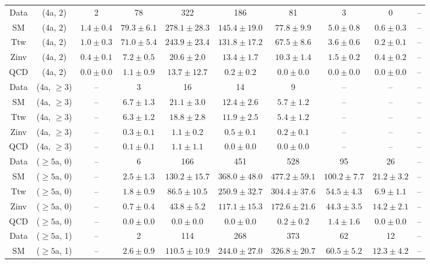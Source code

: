 \begin{table}[h!]
{\begin{tabular}{cccccccccc}
	Data & (4a, 2) & 2 & 78 & 322 & 186 & 81 & 3 & 0 & -- \\[0.5ex] 
	SM & (4a, 2) & $1.4\pm 0.4$ & $79.3\pm 6.1$ & $278.1\pm 28.3$ & $145.4\pm 19.0$ & $77.8\pm 9.9$ & $5.0\pm 0.8$ & $0.6\pm 0.3$ & -- \\[0.5ex] 
	Ttw & (4a, 2) & $1.0\pm 0.3$ & $71.0\pm 5.4$ & $243.9\pm 23.4$ & $131.8\pm 17.2$ & $67.5\pm 8.6$ & $3.6\pm 0.6$ & $0.2\pm 0.1$ & -- \\[0.5ex] 
	Zinv & (4a, 2) & $0.4\pm 0.1$ & $7.2\pm 0.5$ & $20.6\pm 2.0$ & $13.4\pm 1.7$ & $10.3\pm 1.4$ & $1.5\pm 0.2$ & $0.4\pm 0.2$ & -- \\[0.5ex] 
	QCD & (4a, 2) & $0.0\pm 0.0$ & $1.1\pm 0.9$ & $13.7\pm 12.7$ & $0.2\pm 0.2$ & $0.0\pm 0.0$ & $0.0\pm 0.0$ & $0.0\pm 0.0$ & -- \\[0.5ex] 
	Data & (4a, $\ge3$) & -- & 3 & 16 & 14 & 9 & -- & -- & -- \\[0.5ex] 
	SM & (4a, $\ge3$) & -- & $6.7\pm 1.3$ & $21.1\pm 3.0$ & $12.4\pm 2.6$ & $5.7\pm 1.2$ & -- & -- & -- \\[0.5ex] 
	Ttw & (4a, $\ge3$) & -- & $6.3\pm 1.2$ & $18.8\pm 2.8$ & $11.9\pm 2.5$ & $5.4\pm 1.2$ & -- & -- & -- \\[0.5ex] 
	Zinv & (4a, $\ge3$) & -- & $0.3\pm 0.1$ & $1.1\pm 0.2$ & $0.5\pm 0.1$ & $0.2\pm 0.1$ & -- & -- & -- \\[0.5ex] 
	QCD & (4a, $\ge3$) & -- & $0.1\pm 0.1$ & $1.1\pm 1.1$ & $0.0\pm 0.0$ & $0.0\pm 0.0$ & -- & -- & -- \\[0.5ex] 
	Data & ($\ge5$a, 0) & -- & 6 & 166 & 451 & 528 & 95 & 26 & -- \\[0.5ex] 
	SM & ($\ge5$a, 0) & -- & $2.5\pm 1.3$ & $130.2\pm 15.7$ & $368.0\pm 48.0$ & $477.2\pm 59.1$ & $100.2\pm 7.7$ & $21.2\pm 3.2$ & -- \\[0.5ex] 
	Ttw & ($\ge5$a, 0) & -- & $1.8\pm 0.9$ & $86.5\pm 10.5$ & $250.9\pm 32.7$ & $304.4\pm 37.6$ & $54.5\pm 4.3$ & $6.9\pm 1.1$ & -- \\[0.5ex] 
	Zinv & ($\ge5$a, 0) & -- & $0.7\pm 0.4$ & $43.8\pm 5.2$ & $117.1\pm 15.3$ & $172.6\pm 21.6$ & $44.3\pm 3.5$ & $14.2\pm 2.1$ & -- \\[0.5ex] 
	QCD & ($\ge5$a, 0) & -- & $0.0\pm 0.0$ & $0.0\pm 0.0$ & $0.0\pm 0.0$ & $0.2\pm 0.2$ & $1.4\pm 1.6$ & $0.0\pm 0.0$ & -- \\[0.5ex] 
	Data & ($\ge5$a, 1) & -- & 2 & 114 & 268 & 373 & 62 & 12 & -- \\[0.5ex] 
	SM & ($\ge5$a, 1) & -- & $2.6\pm 0.9$ & $110.5\pm 10.9$ & $244.0\pm 27.0$ & $326.8\pm 20.7$ & $60.5\pm 5.2$ & $12.3\pm 4.2$ & -- \\[0.5ex] 

\end{tabular}}
\end{table}
